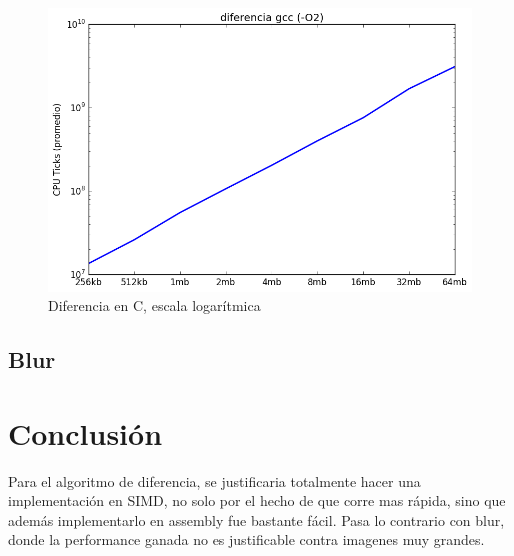\documentclass[a4paper]{article}
\begin{document}
\begin{figure}[h]
	\includegraphics[scale=0.60]{imagenes/test_performance_size_C.png}
	\caption{Diferencia en C, escala logarítmica}
\end{figure}


\subsection{Blur}




\section{Conclusión}

\noindent Para el algoritmo de diferencia, se justificaria totalmente hacer una implementación en SIMD, no solo por el hecho de que corre mas rápida, sino que además implementarlo en assembly fue bastante fácil. Pasa lo contrario con blur, donde la performance ganada no es justificable contra imagenes muy grandes.
\end{document}
